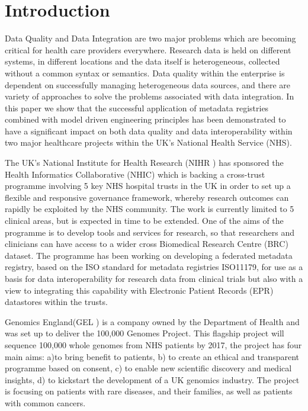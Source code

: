 
\section{Introduction}

Data Quality and Data Integration are two major problems which are becoming critical for health care providers everywhere. Research data is held on different systems, in different locations and the data itself is heterogeneous, collected without a common syntax or semantics. Data quality within the enterprise is dependent on successfully managing heterogeneous data sources, and there are variety of approaches to solve the problems associated with data integration.   In this paper we show that the successful application of metadata registries combined with model driven engineering principles has been demonstrated to have a significant impact on both data quality and data interoperability within two major healthcare projects within the UK's National Health Service (NHS).

The UK's National Institute for Health Research (NIHR \cite{NIHR}) has sponsored the Health Informatics Collaborative  (NHIC) which is backing a cross-trust programme involving 5 key NHS hospital trusts in the UK in order to set up a flexible and responsive governance framework, whereby research outcomes can rapidly be exploited by the NHS community. The work is currently limited to 5 clinical areas, but is expected in time to be extended. One of the aims of the programme is to develop tools and services for research, so that researchers and clinicians can have access to a wider cross Biomedical Research Centre (BRC) dataset. The programme has been working on developing a federated metadata registry, based on the ISO standard for metadata registries ISO11179\cite{ISO11179}, for use as a basis for data interoperability for research data from clinical trials but also with a view to integrating this capability with Electronic Patient Records (EPR) datastores within the trusts.

Genomics England(GEL \cite{GEL}) is a company owned by the Department of Health and was set up to deliver the 100,000 Genomes Project.  This flagship project will sequence 100,000 whole genomes from NHS patients by 2017, the project has four main aims: a)to bring benefit to patients, b) to create an ethical and transparent programme based on consent, c) to enable new scientific discovery and medical insights, d) to kickstart the development of a UK genomics industry. The project is focusing on patients with rare diseases, and their families, as well as patients with common cancers.


